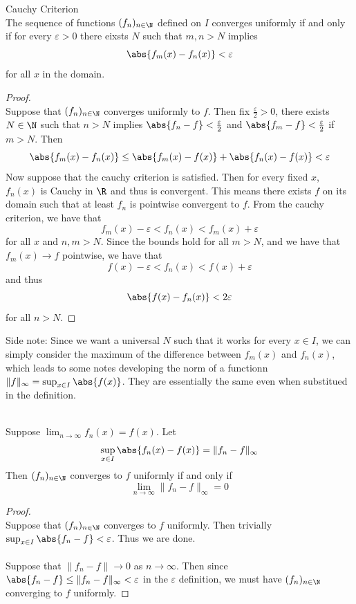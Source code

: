 \documentclass[a4paper]{article}
\begin{document}
\begin{thm}{Cauchy Criterion}{}\\ The sequence of functions $(f_n)_{n\in\N}$ defined on $I$ converges uniformly if and only if for every $\varepsilon>0$ there eixsts $N$ such that $m,n>N$ implies $$\abs{f_m(x)-f_n(x)}<\varepsilon$$ for all $x$ in the domain. 
\begin{proof}\\
Suppose that $(f_n)_{n\in\N}$ converges uniformly to $f$. Then fix $\frac{\varepsilon}{2}>0$, there exists $N\in\N$ such that $n>N$ implies $\abs{f_n-f}<\frac{\varepsilon}{2}$ and $\abs{f_m-f}<\frac{\varepsilon}{2}$ if $m>N$. Then $$\abs{f_m(x)-f_n(x)}\leq\abs{f_m(x)-f(x)}+\abs{f_n(x)-f(x)}<\varepsilon$$
Now suppose that the cauchy criterion is satisfied. Then for every fixed $x$, $f_n(x)$ is Cauchy in $\R$ and thus is convergent. This means there exists $f$ on its domain such that at least $f_n$ is pointwise convergent to $f$. From the cauchy criterion, we have that $$f_m(x)-\varepsilon<f_n(x)<f_m(x)+\varepsilon$$ for all $x$ and $n,m>N$. Since the bounds hold for all $m>N$, and we have that $f_m(x)\to f$ pointwise, we have that $$f(x)-\varepsilon<f_n(x)<f(x)+\varepsilon$$ and thus $$\abs{f(x)-f_n(x)}<2\varepsilon$$ for all $n>N$. 
\end{proof}
\end{thm}

Side note: Since we want a universal $N$ such that it works for every $x\in I$, we can simply consider the maximum of the difference between $f_m(x)$ and $f_n(x)$, which leads to some notes developing the norm of a functionn $\|f\|_{\infty}=\sup_{x\in I}\abs{f(x)}$. They are essentially the same even when substitued in the definition. 

\begin{prp}{}{}\\ Suppose $\lim_{n\to\infty}f_n(x)=f(x)$. Let $$\sup_{x\in I}\abs{f_n(x)-f(x)}=\|f_n-f\|_\infty$$ Then $(f_n)_{n\in\N}$ converges to $f$ uniformly if and only if $$\lim_{n\to\infty}\|f_n-f\|_\infty=0$$ 
\begin{proof}\\
Suppose that $(f_n)_{n\in\N}$ converges to $f$ uniformly. Then trivially $\sup_{x\in I}\abs{f_n-f}<\varepsilon$. Thus we are done. \\~\\
Suppose that $\|f_n-f\|\to 0$ as $n\to\infty$. Then since $\abs{f_n-f}\leq\|f_n-f\|_\infty<\varepsilon$ in the $\varepsilon$ definition, we must have $(f_n)_{n\in\N}$ converging to $f$ uniformly. 
\end{proof}
\end{prp}
\end{document}
